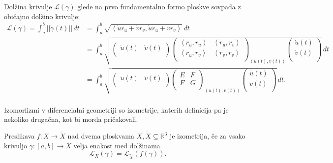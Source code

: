 \begin{opomba}
 Dolžina krivulje $\mathcal{L}(\gamma)$ glede na prvo fundamentalno
 formo ploskve sovpada z običajno dolžino krivulje: \begin{align*}
    \mathcal{L}(\gamma)  = \int_{a}^{b} \lvert\lvert \dot{\gamma}(t) \rvert\rvert  \, dt  &=
	 \int_{a}^{b} \sqrt{\left<\dot{u}r_u + \dot{v}r_v, \dot{u}r_u + \dot{v}r_v \right> }  \, dt \\
        &= \int_{a}^{b} \sqrt{ 
\begin{pmatrix}
	\dot{u}(t) & \dot{v}(t) \\
\end{pmatrix}
\begin{pmatrix}
	\left<r_u, r_u \right> & \left<r_u, r_v \right>  \\
	\left< r_u, r_v \right>	  & \left<r_v, r_v \right> \\
\end{pmatrix}_{(u(t), v(t))}
\begin{pmatrix}
	\dot{u}(t) \\
	\dot{v}(t) \\
\end{pmatrix}
}  \, dt  \\
 &=  \int_{a}^{b} \sqrt{ 
\begin{pmatrix}
	\dot{u}(t) & \dot{v}(t) \\
\end{pmatrix}
\begin{pmatrix}
	E & F \\
	F & G \\
\end{pmatrix}_{(u(t), v(t))}
\begin{pmatrix}
	\dot{u}(t) \\
	\dot{v}(t) \\
\end{pmatrix}
}  \, dt.  \\
 \end{align*}
\end{opomba}

Izomorfizmi v diferencialni geometriji so izometrije, katerih
definicija pa je nekoliko drugačna, kot bi morda pričakovali.

\begin{definicija}
\label{def_izometrija}
 Preslikava $f: X \to \tilde{X}$ nad dvema ploskvama $X, \tilde{X} \subseteq
 \mathbb{R}^3$ je izometrija, če za vsako krivuljo $\gamma: \left[ a,b
 \right] \to  X$ velja enakost med dolžinama 
 \begin{equation*} \mathcal{L}_X(\gamma) = \mathcal{L}_{\tilde{X}}(f(\gamma)). \end{equation*}
\end{definicija}

